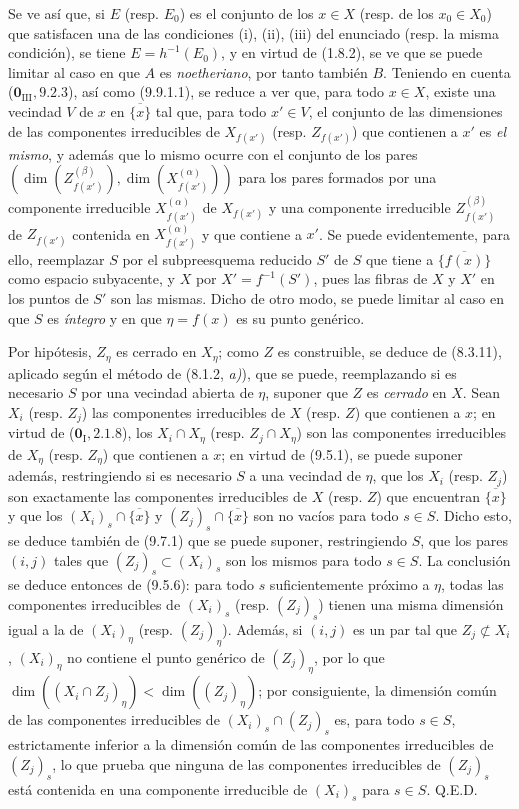 Se ve así que, si $E$ (resp. $E_0$) es el conjunto de los $x\in X$ (resp. de los
$x_0\in X_0$) que satisfacen una de las condiciones (i), (ii), (iii) del enunciado
(resp. la misma condición), se tiene $E=h^{-1}(E_0)$, y en virtud de (1.8.2), se
ve que se puede limitar al caso en que $A$ es \emph{noetheriano}, por tanto también $B$.
Teniendo en cuenta ($\mathbf 0_{\mathrm{III}},9.2.3$), así como (9.9.1.1), se
reduce a ver que, para todo $x\in X$, existe una vecindad $V$ de $x$ en
$\overline{\{x\}}$ tal que, para todo $x'\in V$, el conjunto de las dimensiones de las
componentes irreducibles de $X_{f(x')}$ (resp. $Z_{f(x')}$) que contienen a $x'$ es
\emph{el mismo}, y además que lo mismo ocurre con el conjunto de los pares
$(\dim(Z_{f(x')}^{(\beta)}),\dim(X_{f(x')}^{(\alpha)}))$
para los pares formados por una componente irreducible $X_{f(x')}^{(\alpha)}$
de $X_{f(x')}$ y una componente irreducible $Z_{f(x')}^{(\beta)}$ de
$Z_{f(x')}$ contenida en $X_{f(x')}^{(\alpha)}$ y que contiene a $x'$. Se puede
evidentemente, para ello, reemplazar $S$ por el subpreesquema reducido $S'$ de $S$
que tiene a $\overline{\{f(x)\}}$ como espacio subyacente, y $X$ por
$X'=f^{-1}(S')$, pues las fibras de $X$ y $X'$ en los puntos de $S'$ son las mismas.
Dicho de otro modo, se puede limitar al caso en que $S$ es \emph{íntegro} y en que
$\eta=f(x)$ es su punto genérico.

Por hipótesis, $Z_\eta$ es cerrado en $X_\eta$; como $Z$ es construible,
se deduce de (8.3.11), aplicado según el método de (8.1.2, \emph{a)}), que se
puede, reemplazando si es necesario $S$ por una vecindad abierta de $\eta$, suponer
que $Z$ es \emph{cerrado} en $X$. Sean $X_i$ (resp. $Z_j$) las componentes
irreducibles de $X$ (resp. $Z$) que contienen a $x$; en virtud de
($\mathbf 0_{\mathrm I},2.1.8$), los $X_i\cap X_\eta$ (resp.
$Z_j\cap X_\eta$) son las componentes irreducibles de $X_\eta$ (resp.
$Z_\eta$) que contienen a $x$; en virtud de (9.5.1), se puede suponer además,
restringiendo si es necesario $S$ a una vecindad de $\eta$, que los $X_i$ (resp.
$Z_j$) son exactamente las componentes irreducibles de $X$ (resp. $Z$)
que encuentran $\overline{\{x\}}$ y que los
$(X_i)_s\cap\overline{\{x\}}$ y $(Z_j)_s\cap\overline{\{x\}}$ son no vacíos
para todo $s\in S$. Dicho esto, se deduce también de (9.7.1) que se puede
suponer, restringiendo $S$, que los pares $(i,j)$ tales que
$(Z_j)_s\subset(X_i)_s$ son los mismos para todo $s\in S$. La conclusión
se deduce entonces de (9.5.6): para todo $s$ suficientemente próximo a $\eta$, todas las
componentes irreducibles de $(X_i)_s$ (resp. $(Z_j)_s$) tienen una misma dimensión
igual a la de $(X_i)_\eta$ (resp. $(Z_j)_\eta$). Además, si $(i,j)$ es un
par tal que $Z_j\not\subset X_i$, $(X_i)_\eta$ no contiene el
punto genérico de $(Z_j)_\eta$, por lo que
$\dim((X_i\cap Z_j)_\eta)<\dim((Z_j)_\eta)$; por consiguiente, la dimensión común
de las componentes irreducibles de $(X_i)_s\cap(Z_j)_s$ es, para todo $s\in S$,
estrictamente inferior a la dimensión común de las componentes irreducibles de
$(Z_j)_s$, lo que prueba que ninguna de las componentes irreducibles de $(Z_j)_s$
está contenida en una componente irreducible de $(X_i)_s$ para $s\in S$.
Q.E.D.

